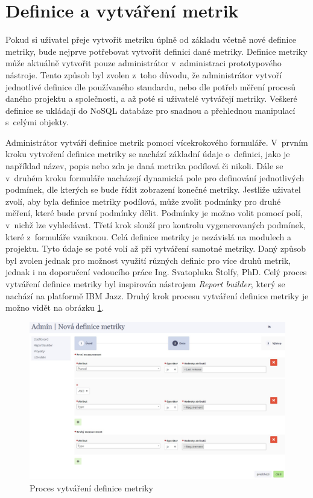 \documentclass[czech,master]{diploma}
\begin{document}

\section{Definice a vytváření metrik}
Pokud si uživatel přeje vytvořit metriku úplně od základu včetně nové definice metriky, bude nejprve potřebovat vytvořit definici dané metriky. Definice metriky může aktuálně vytvořit pouze administrátor v~administraci prototypového nástroje. Tento způsob byl zvolen z~toho důvodu, že administrátor vytvoří jednotlivé definice dle používaného standardu, nebo dle potřeb měření procesů daného projektu a společnosti, a až poté si uživatelé vytvářejí metriky. Veškeré definice se ukládají do NoSQL databáze pro snadnou a přehlednou manipulací s~celými objekty.

Administrátor vytváří definice metrik pomocí vícekrokového formuláře. V~prvním kroku vytvoření definice metriky se nachází základní údaje o~definici, jako je například název, popis nebo zda je daná metrika podílová či nikoli. Dále se v~druhém kroku formuláře nacházejí dynamická pole pro definování jednotlivých podmínek, dle kterých se bude řídit zobrazení konečné metriky. Jestliže uživatel zvolí, aby byla definice metriky podílová, může zvolit podmínky pro druhé měření, které bude první podmínky dělit. Podmínky je možno volit pomocí polí, v~nichž lze vyhledávat. Třetí krok slouží pro kontrolu vygenerovaných podmínek, které z~formuláře vzniknou. Celá definice metriky je nezávislá na modulech a projektu. Tyto údaje se poté volí až při vytváření samotné metriky. Daný způsob byl zvolen jednak pro možnost využití různých definic pro více druhů metrik, jednak i na doporučení vedoucího práce Ing. Svatopluka Štolfy, PhD. Celý proces vytváření definice metriky byl inspirován nástrojem \textit{Report builder}, který se nachází na platformě IBM Jazz. Druhý krok procesu vytváření definice metriky je možno vidět na obrázku \ref{fig:report_builder_admin}.

\begin{figure}[!ht]
    \centering
    \includegraphics[width=1\textwidth]{Diplomka/Figures/report_builder.jpg}
    \caption{Proces vytváření definice metriky}
    \label{fig:report_builder_admin}
\end{figure}
\end{document}
